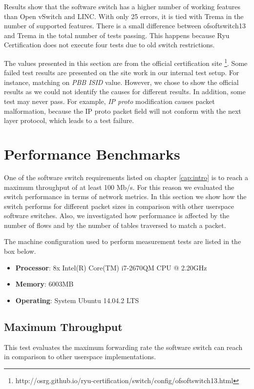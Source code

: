 Results show that the software switch has a higher number of working features than Open vSwitch and LINC. With only 25 errors, it is tied with Trema in the number of supported features. There is a small difference between ofsoftswitch13 and Trema in the total number of tests passing. This happens because Ryu Certification does not execute four tests due to old switch restrictions.

The values presented in this section are from the official certification site \footnote{http://osrg.github.io/ryu-certification/switch/config/ofsoftswitch13.html}. Some failed test results are presented on the site work in our internal test setup. For instance, matching on \textit{PBB ISID} value. However, we chose to show the official results as we could not identify the causes for different results. In addition, some test may never pass. For example, \textit{IP proto} modification causes packet malformation, because the IP proto packet field will not conform with the next layer protocol, which leads to a test failure. 

\section{Performance Benchmarks}

One of the software switch requirements listed on chapter \ref{cap:intro} is to reach a maximum throughput of at least 100 Mb/s. For this reason we evaluated the switch performance in terms of network metrics. In this section we show how the switch performs for different packet sizes in comparison with other userspace software switches. Also, we investigated how performance is affected by the number of flows and by the number of tables traversed to match a packet.  

The machine configuration used to perform measurement tests are listed in the box below. 

\begin{framed}

\begin{itemize}
\item \textbf{Processor}:	8x Intel(R) Core(TM) i7-2670QM CPU @ 2.20GHz
\item \textbf{Memory}:	6003MB 
\item \textbf{Operating}: System	Ubuntu 14.04.2 LTS
\end{itemize}

\end{framed}

    \subsection{Maximum Throughput}
    \label{sec:MaxBand}
    This test evaluates the maximum forwarding rate the software switch can reach in comparison to other userspace implementations. 
    
